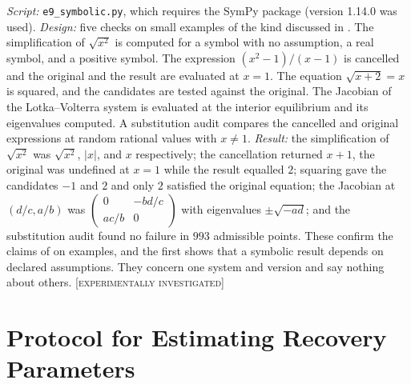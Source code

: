 \documentclass[11pt,twoside,openright]{book}
\theoremstyle{plain}
\theoremstyle{definition}
\theoremstyle{remark}
\newcommand{\Tested}{\textup{\textsc{[experimentally investigated]}}}
\begin{document}
\emph{Script:} \texttt{e9\_symbolic.py}, which requires the SymPy package (version 1.14.0 was used). \emph{Design:} five checks on small examples of the kind discussed in . The simplification of $\sqrt{x^2}$ is computed for a symbol with no assumption, a real symbol, and a positive symbol. The expression $(x^2-1)/(x-1)$ is cancelled and the original and the result are evaluated at $x=1$. The equation $\sqrt{x+2}=x$ is squared, and the candidates are tested against the original. The Jacobian of the Lotka--Volterra system is evaluated at the interior equilibrium and its eigenvalues computed. A substitution audit compares the cancelled and original expressions at random rational values with $x\ne1$. \emph{Result:} the simplification of $\sqrt{x^2}$ was $\sqrt{x^2}$, $|x|$, and $x$ respectively; the cancellation returned $x+1$, the original was undefined at $x=1$ while the result equalled $2$; squaring gave the candidates $-1$ and $2$ and only $2$ satisfied the original equation; the Jacobian at $(d/c,a/b)$ was $\begin{pmatrix}0&-bd/c\\ac/b&0\end{pmatrix}$ with eigenvalues $\pm\sqrt{-ad}$; and the substitution audit found no failure in $993$ admissible points. These confirm the claims of  on examples, and the first shows that a symbolic result depends on declared assumptions. They concern one system and version and say nothing about others. \Tested{}

\chapter{Protocol for Estimating Recovery Parameters}\label{app:protocol}
\end{document}
